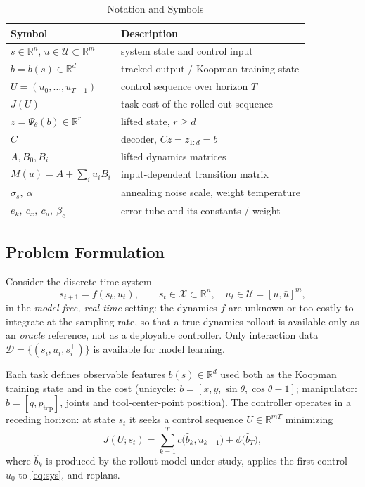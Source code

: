\documentclass[lettersize,journal]{IEEEtran}
\theoremstyle{remark}
\begin{document}
\begin{table}[t]
\centering
\caption{Notation and Symbols}
\label{tab:notation}
\begin{tabularx}{\linewidth}{l X}
\hline
Symbol & Description \\
\hline
$s \in \mathbb{R}^n$, $u \in \mathcal{U} \subset \mathbb{R}^m$ & system state and control input \\
$b = b(s) \in \mathbb{R}^d$ & tracked output / Koopman training state \\
$U = (u_0, \dots, u_{T-1})$ & control sequence over horizon $T$ \\
$J(U)$ & task cost of the rolled-out sequence \\
$z = \Psi_\theta(b) \in \mathbb{R}^r$ & lifted state, $r \ge d$ \\
$C$ & decoder, $Cz = z_{1:d} = b$ \\
$A, B_0, B_i$ & lifted dynamics matrices \\
$M(u) = A + \sum_i u_i B_i$ & input-dependent transition matrix \\
$\sigma_s,\ \alpha$ & annealing noise scale, weight temperature \\
$e_k,\ c_x,\ c_u,\ \beta_e$ & error tube and its constants / weight \\
\hline
\end{tabularx}
\end{table}

\subsection{Problem Formulation}\label{subsec:problem}

Consider the discrete-time system
\begin{equation}
s_{t+1} = f(s_t, u_t), \qquad
s_t \in \mathcal{X} \subset \mathbb{R}^{n},\quad
u_t \in \mathcal{U} = [\underline{u}, \bar{u}]^{m},
\label{eq:sys}
\end{equation}
in the \emph{model-free, real-time} setting: the dynamics $f$ are unknown or
too costly to integrate at the sampling rate, so that a true-dynamics
rollout is available only as an \emph{oracle} reference, not as a deployable
controller. Only interaction data
$\mathcal{D} = \{(s_i, u_i, s_i^{+})\}$ is available for model learning.

Each task defines observable features $b(s) \in \mathbb{R}^{d}$ used both as
the Koopman training state and in the cost (unicycle:
$b = [x, y, \sin\theta, \cos\theta - 1]$; manipulator:
$b = [q, p_{\mathrm{tcp}}]$, joints and tool-center-point position). The controller operates in a receding
horizon: at state $s_t$ it seeks a control sequence
$U \in \mathbb{R}^{mT}$ minimizing
\begin{equation}
J(U; s_t) = \sum_{k=1}^{T} c\big(\hat{b}_k, u_{k-1}\big)
+ \phi\big(\hat{b}_T\big),
\label{eq:cost}
\end{equation}
where $\hat b_k$ is produced by the rollout model under study, applies the
first control $u_0$ to \eqref{eq:sys}, and replans.
\end{document}
